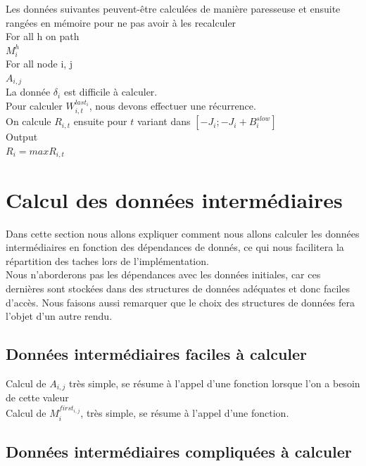 \documentclass[10pt,a4paper]{article}
\begin{document}
Les données suivantes peuvent-être calculées de manière paresseuse et ensuite rangées en mémoire pour ne pas avoir à les recalculer\\
For all h on path\\
$M_i^{h}$\\
For all node i, j\\
$A_{i,j}$\\

La donnée $\delta_i$ est difficile à calculer.\\
Pour calculer $W_{i,t}^{last_i}$, nous devons effectuer une récurrence.\\
On calcule $R_{i,t}$ ensuite pour $t$ variant dans $[-J_i;-J_i+B_i^{slow}]$\\

Output\\
$R_{i} = max R_{i,t}$\\



\section{Calcul des données intermédiaires}
Dans cette section nous allons expliquer comment nous allons calculer les données 
intermédiaires en fonction des dépendances de donnés, ce qui nous facilitera la répartition 
des taches lors de l'implémentation.\\
Nous n'aborderons pas les dépendances avec les données initiales, car ces dernières sont stockées 
dans des structures de données adéquates et donc faciles d'accès.
Nous faisons aussi remarquer que le choix des structures de données fera 
l'objet d'un autre rendu.

\subsection{Données intermédiaires faciles à calculer}
Calcul de $A_{i,j}$ très simple, se résume à l'appel d'une fonction lorsque l'on a besoin de 
cette valeur\\
Calcul de $M_{i}^{first_{i,j}}$, très simple, se résume à l'appel d'une fonction.

\subsection{Données intermédiaires compliquées à calculer}
\end{document}
